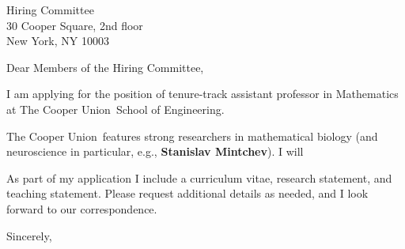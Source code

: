 \documentclass[11pt,a4paper]{letter}
\begin{document}
\def\School{The Cooper Union}
\begin{letter}
{Hiring Committee\\
30 Cooper Square, 2nd floor\\
New York, NY 10003}


\opening{Dear Members of the Hiring Committee,}

I am applying for the position of tenure-track assistant professor in Mathematics at \School~School of Engineering. 



\School~features strong researchers in mathematical biology (and neuroscience in particular, e.g., \textbf{Stanislav Mintchev}). I will 



As part of my application I include a curriculum vitae, research statement, and teaching statement. Please request additional details as needed, and I look forward to our correspondence.

\closing{Sincerely,}
\end{letter}
\end{document}
